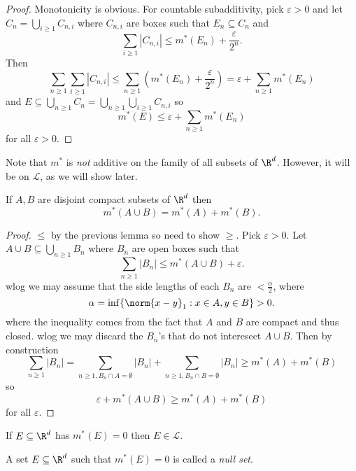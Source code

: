 \documentclass[a4paper]{article}
\begin{document}
\begin{proof}
  Monotonicity is obvious. For countable subadditivity, pick \(\varepsilon > 0\) and let \(C_n = \bigcup_{i \geq 1} C_{n, i}\) where \(C_{n, i}\) are boxes such that \(E_n \subseteq C_n\) and
  \[
    \sum_{i \geq 1} |C_{n, i}| \leq m^*(E_n) + \frac{\varepsilon}{2^n}.
  \]
  Then
  \[
    \sum_{n \geq 1} \sum_{i \geq 1} |C_{n, i}|
    \leq \sum_{n \geq 1} (m^*(E_n) + \frac{\varepsilon}{2^n})
    = \varepsilon + \sum_{n \geq 1} m^*(E_n)
  \]
  and \(E \subseteq \bigcup_{n \geq 1} C_n = \bigcup_{n \geq 1} \bigcup_{i \geq 1} C_{n, i}\) so
  \[
    m^*(E) \leq \varepsilon + \sum_{n \geq 1} m^*(E_n)
  \]
  for all \(\varepsilon > 0\).
\end{proof}

\begin{remark}
  Note that \(m^*\) is \emph{not} additive on the family of all subsets of \(\R^d\). However, it will be on \(\mathcal L\), as we will show later.
\end{remark}

\begin{lemma}
  If \(A, B\) are disjoint compact subsets of \(\R^d\) then
  \[
    m^*(A \cup B) = m^*(A) + m^*(B).
  \]
\end{lemma}

\begin{proof}
  \(\leq\) by the previous lemma so need to show \(\geq\). Pick \(\varepsilon > 0\). Let \(A \cup B \subseteq \bigcup_{n \geq 1} B_n\) where \(B_n\) are open boxes such that
  \[
    \sum_{n \geq 1} |B_n| \leq m^*(A \cup B) + \varepsilon.
  \]
  wlog we may assume that the side lengths of each \(B_n\) are \(< \frac{\alpha}{2}\), where
  \[
    \alpha = \inf \{\norm{x - y}_1: x \in A, y \in B\} > 0.
  \]
  where the inequality comes from the fact that \(A\) and \(B\) are compact and thus closed. wlog we may discard the \(B_n\)'s that do not interesect \(A \cup B\). Then by construction
  \[
    \sum_{n \geq 1} |B_n| = \sum_{n \geq 1, B_n \cap A = \emptyset} |B_n| + \sum_{n \geq 1, B_n \cap B = \emptyset} |B_n|
    \geq m^*(A) + m^*(B)
  \]
  so
  \[
    \varepsilon + m^*(A \cup B) \geq m^*(A) + m^*(B)
  \]
  for all \(\varepsilon\).
\end{proof}

\begin{lemma}
  If \(E \subseteq \R^d\) has \(m^*(E) = 0\) then \(E \in \mathcal L\).
\end{lemma}

\begin{definition}
  A set \(E \subseteq \R^d\) such that \(m^*(E) = 0\) is called a \emph{null set}.
\end{definition}
\end{document}
